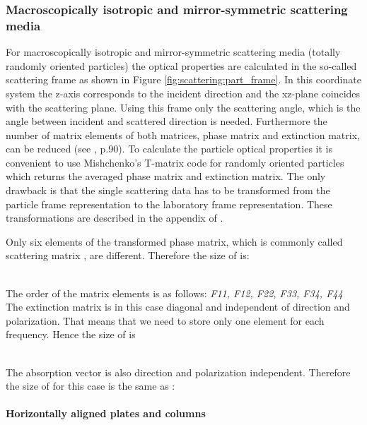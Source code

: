 \subsubsection{Macroscopically isotropic and mirror-symmetric scattering
  media}
For macroscopically isotropic and mirror-symmetric scattering media
(totally randomly oriented particles) the optical properties are
calculated in the so-called scattering frame as shown in
Figure \ref{fig:scattering:part_frame}. In this coordinate 
system the z-axis corresponds to the incident direction and the
xz-plane coincides with the scattering plane. Using this frame only
the scattering angle, which is the angle between incident and
scattered direction is needed. Furthermore the number of matrix
elements of both matrices, phase matrix and extinction matrix, can be
reduced (see \citet{Mishchenko:02}, p.90). To calculate the
particle optical properties it is convenient to use Mishchenko's
T-matrix code for randomly oriented particles \citep{Mishchenko:98}
which returns the averaged phase matrix and extinction matrix. 
The only drawback is that the single scattering data has
to be transformed from the particle frame representation to the
laboratory frame representation. These transformations are described
in the appendix of \citet{emde05:_phdthesis}.

Only six elements of the transformed phase matrix, which is commonly
called scattering matrix \ScaMat, are different. Therefore the size of
 is: 

\shortcode{[N\_f N\_T N\_za\_sca 1 1 1 6]}\\
The order of the matrix elements is as follows: {\sl F11, F12, F22,
  F33, F34, F44}\\
The extinction matrix is in this case diagonal and independent of
direction and polarization. That means that we need to store only one
element for each frequency. Hence the size of
 is
 
\shortcode{[N\_f N\_T 1 1 1]}\\
The absorption vector is also direction and polarization
independent. Therefore the size of  for this
case is the same as : 

\shortcode{[N\_f N\_T 1 1 1]}

\paragraph{Horizontally aligned plates and columns}


